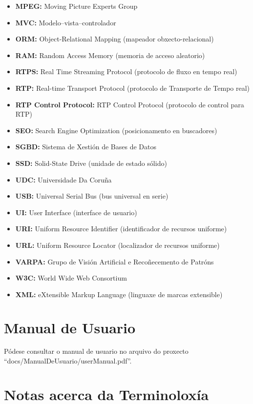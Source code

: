 \begin{itemize}
    \item \textbf{MPEG:} Moving Picture Experts Group 
    \item \textbf{MVC:} Modelo–vista–controlador
    \item \textbf{ORM:} Object-Relational Mapping (mapeador obxecto-relacional)
    \item \textbf{RAM:} Random Access Memory (memoria de acceso aleatorio)
    \item \textbf{RTPS:} Real Time Streaming Protocol (protocolo de fluxo en tempo real)
    \item \textbf{RTP:} Real-time Transport Protocol (protocolo de Transporte de Tempo real)
    \item \textbf{RTP Control Protocol:} RTP Control Protocol (protocolo de control para RTP)
    \item \textbf{SEO:} Search Engine Optimization (posicionamento en buscadores)
    \item \textbf{SGBD:} Sistema de Xestión de Bases de Datos
    \item \textbf{SSD:} Solid-State Drive (unidade de estado sólido)
    \item \textbf{UDC:} Universidade Da Coruña
    \item \textbf{USB:} Universal Serial Bus (bus universal en serie)
    \item \textbf{UI:} User Interface (interface de usuario)
    \item \textbf{URI:} Uniform Resource Identifier (identificador de recursos uniforme)
    \item \textbf{URL:} Uniform Resource Locator (localizador de recursos uniforme)
    \item \textbf{VARPA:} Grupo de Visión Artificial e Recoñecemento de Patróns
    \item \textbf{W3C:} World Wide Web Consortium
    \item \textbf{XML:} eXtensible Markup Language (linguaxe de marcas extensible)
    
\end{itemize}


\section{Manual de Usuario}
    Pódese consultar o manual de usuario no arquivo do proxecto\\
    ``docs/ManualDeUsuario/userManual.pdf''.

\section{Notas acerca da Terminoloxía}

